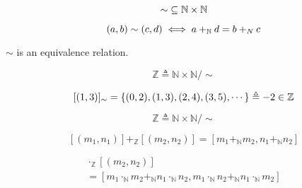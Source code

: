 \begin{frame}{}
  \begin{definition}
    \[
      \sim\; \subseteq \mathbb{N} \times \mathbb{N}
    \]

    \[
      (a, b) \sim (c, d) \iff a +_{\mathbb{N}} d = b +_{N} c
    \]
  \end{definition}

  \pause
  \vspace{0.30cm}
  \begin{theorem}
    $\sim$ is an equivalence relation.
  \end{theorem}

  \pause
  \vspace{0.30cm}
  \begin{center}
  \end{center}

  \pause
  \begin{definition}[$\mathbb{Z}$]
    \[
      \mathbb{Z} \triangleq \mathbb{N} \times \mathbb{N}/\sim
    \]
  \end{definition}

  \pause
  \[
    [(1, 3)]_{\sim} = \{(0, 2), (1, 3), (2, 4), (3, 5), \cdots\} \triangleq -2 \in \mathbb{Z}
  \]
\end{frame}

\begin{frame}{}
  \[
    \mathbb{Z} \triangleq \mathbb{N} \times \mathbb{N}/\sim
  \]
\end{frame}

\begin{frame}{}
  \begin{definition}[$+_\mathbb{Z}$]
    \[
      [(m_1, n_1)] +_{\mathbb{Z}} [(m_2, n_2)] = [m_1 +_{\mathbb{N}} m_2, n_1 +_{\mathbb{N}} n_2]
    \]
  \end{definition}

  \pause
  \vspace{0.60cm}
  \begin{definition}
    \begin{gather*}
      [(m_1, n_1)] \cdot_{\mathbb{Z}} [(m_2, n_2)] \\
      = [m_1 \cdot_{\mathbb{N}} m_2 +_{\mathbb{N}} n_1 \cdot_{\mathbb{N}} n_2,
         m_1 \cdot_{\mathbb{N}} n_2 +_{\mathbb{N}} n_1 \cdot_{\mathbb{N}} m_2]
    \end{gather*}
  \end{definition}
\end{frame}

